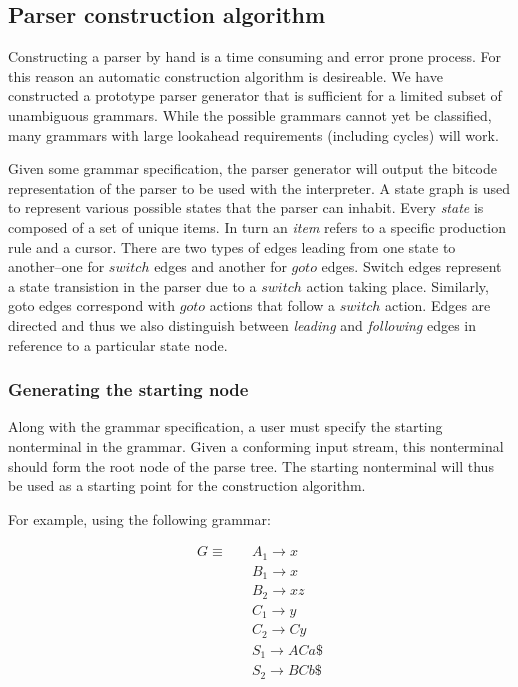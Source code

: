 \documentclass[envcountsame,runningheads]{llncs}
\begin{document}
\subsection{Parser construction algorithm}
Constructing a parser by hand is a time consuming and error prone process. For this reason an automatic construction algorithm is desireable.
We have constructed a prototype parser generator that is sufficient for a limited subset of unambiguous grammars.
While the possible grammars cannot yet be classified, many grammars with large lookahead requirements (including cycles) will work.

Given some grammar specification, the parser generator will output the bitcode representation of the parser to be used with the interpreter.
A state graph is used to represent various possible states that the parser can inhabit. 
Every \emph{state} is composed of a set of unique items.
In turn an \emph{item} refers to a specific production rule and a cursor.
There are two types of edges leading from one state to another--one for $switch$ edges and another for $goto$ edges.
Switch edges represent a state transistion in the parser due to a $switch$ action taking place. 
Similarly, goto edges correspond with $goto$ actions that follow a $switch$ action.
Edges are directed and thus we also distinguish between \emph{leading} and \emph{following} edges in reference to a particular state node.\\

\subsubsection{Generating the starting node}
Along with the grammar specification, a user must specify the starting nonterminal in the grammar. Given a conforming input stream, this nonterminal should form the root node of the parse tree.
The starting nonterminal will thus be used as a starting point for the construction algorithm.
 
For example, using the following grammar:

\parbox{.3\textwidth}{\begin{align*}
G \equiv \quad & A_1 \rightarrow x\\
               & B_1 \rightarrow x\\
               & B_2 \rightarrow x z\\
               & C_1 \rightarrow y\\
               & C_2 \rightarrow C y\\
               & S_1 \rightarrow A C a \$\\
               & S_2 \rightarrow B C b \$
\end{align*}}
\end{document}
